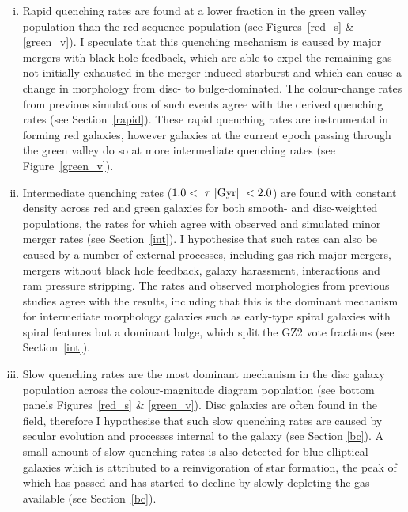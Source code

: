 \begin{enumerate}[(i)]
\item Rapid quenching rates are found at a lower fraction in the green valley population than the red sequence population (see Figures~\ref{red_s} \& \ref{green_v}). I speculate that this quenching mechanism is caused by major mergers with black hole feedback, which are able to expel the remaining gas not initially exhausted in the merger-induced starburst and which can cause a change in morphology from disc- to bulge-dominated. The colour-change rates from previous simulations of such events agree with the derived quenching rates (see Section~\ref{rapid}). These rapid quenching rates are instrumental in forming red galaxies, however galaxies at the current epoch passing through the green valley do so at more intermediate quenching rates (see Figure~\ref{green_v}).

\item Intermediate quenching rates ($1.0 < ~\tau~\rm{[Gyr]}~ < 2.0 $) are found with constant density across red and green galaxies for both smooth- and disc-weighted populations, the rates for which agree with observed and simulated minor merger rates (see Section~\ref{int}). I hypothesise that such rates can also be caused by a number of external processes, including gas rich major mergers, mergers without black hole feedback, galaxy harassment, interactions and ram pressure stripping. The rates and observed morphologies from previous studies agree with the results, including that this is the dominant mechanism for intermediate morphology galaxies such as early-type spiral galaxies with spiral features but a dominant bulge, which split the GZ2 vote fractions (see Section~\ref{int}). 

\item Slow quenching rates are the most dominant mechanism in the disc galaxy population across the colour-magnitude diagram population (see bottom panels Figures~\ref{red_s} \& \ref{green_v}). Disc galaxies are often found in the field, therefore I hypothesise that such slow quenching rates are caused by secular evolution and processes internal to the galaxy (see Section \ref{bc}). A small amount of slow quenching rates is also detected for blue elliptical galaxies which is attributed to a reinvigoration of star formation, the peak of which has passed and has started to decline by slowly depleting the gas available (see Section~\ref{bc}). 
\end{enumerate}
